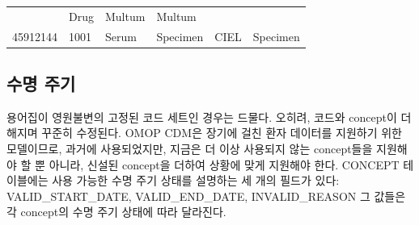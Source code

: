 \documentclass[11pt]{book}
\theoremstyle{definition}
\theoremstyle{definition}
\theoremstyle{definition}
\theoremstyle{remark}
\begin{document}
\begin{longtable}[]{@{}llllll@{}}
\begin{minipage}[t]{0.16\columnwidth}
\end{minipage} & \begin{minipage}[t]{0.14\columnwidth}\raggedright\strut
Drug\strut
\end{minipage} & \begin{minipage}[t]{0.14\columnwidth}\raggedright\strut
Multum\strut
\end{minipage} & \begin{minipage}[t]{0.14\columnwidth}\raggedright\strut
Multum\strut
\end{minipage}\tabularnewline
\begin{minipage}[t]{0.13\columnwidth}\raggedright\strut
45912144\strut
\end{minipage} & \begin{minipage}[t]{0.07\columnwidth}\raggedright\strut
1001\strut
\end{minipage} & \begin{minipage}[t]{0.16\columnwidth}\raggedright\strut
Serum\strut
\end{minipage} & \begin{minipage}[t]{0.14\columnwidth}\raggedright\strut
Specimen\strut
\end{minipage} & \begin{minipage}[t]{0.14\columnwidth}\raggedright\strut
CIEL\strut
\end{minipage} & \begin{minipage}[t]{0.14\columnwidth}\raggedright\strut
Specimen\strut
\end{minipage}\tabularnewline
\bottomrule
\end{longtable}

\subsection{수명 주기}\label{conceptLifeCycle}

용어집이 영원불변의 고정된 코드 세트인 경우는 드물다. 오히려, 코드와
concept이 더해지며 꾸준히 수정된다. OMOP CDM은 장기에 걸친 환자 데이터를
지원하기 위한 모델이므로, 과거에 사용되었지만, 지금은 더 이상 사용되지
않는 concept들을 지원해야 할 뿐 아니라, 신설된 concept을 더하여 상황에
맞게 지원해야 한다. CONCEPT 테이블에는 사용 가능한 수명 주기 상태를
설명하는 세 개의 필드가 있다: VALID\_START\_DATE, VALID\_END\_DATE,
INVALID\_REASON 그 값들은 각 concept의 수명 주기 상태에 따라 달라진다.
\end{document}
